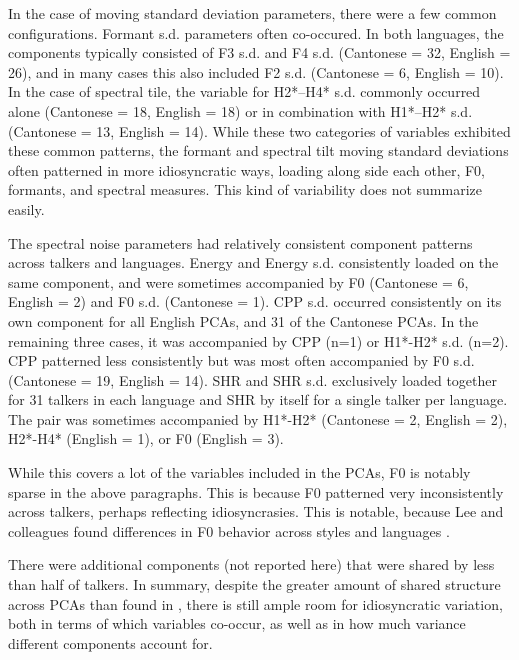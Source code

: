 
In the case of moving standard deviation parameters, there were a few common configurations. Formant s.d. parameters often co-occured. In both languages, the components typically consisted of F3 s.d. and F4 s.d. (Cantonese = 32, English = 26), and in many cases this also included F2 s.d. (Cantonese = 6, English = 10). In the case of spectral tile, the variable for H2*--H4* s.d. commonly occurred alone (Cantonese = 18, English = 18) or in combination with H1*--H2* s.d. (Cantonese = 13, English = 14). While these two categories of variables exhibited these common patterns, the formant and spectral tilt moving standard deviations often patterned in more idiosyncratic ways, loading along side each other, F0, formants, and spectral measures. This kind of variability does not summarize easily.

The spectral noise parameters had relatively consistent component patterns across talkers and languages. Energy and Energy s.d. consistently loaded on the same component, and were sometimes accompanied by F0 (Cantonese = 6, English = 2) and F0 s.d. (Cantonese = 1). CPP s.d. occurred consistently on its own component for all English PCAs, and 31 of the Cantonese PCAs. In the remaining three cases, it was accompanied by CPP (n=1) or H1*-H2* s.d. (n=2). CPP patterned less consistently but was most often accompanied by F0 s.d. (Cantonese = 19, English = 14). SHR and SHR s.d. exclusively loaded together for 31 talkers in each language and SHR by itself for a single talker per language. The pair was sometimes accompanied by H1*-H2* (Cantonese = 2, English = 2), H2*-H4* (English = 1), or F0 (English = 3). 

While this covers a lot of the variables included in the PCAs, F0 is notably sparse in the above paragraphs. This is because F0 patterned very inconsistently across talkers, perhaps reflecting idiosyncrasies. This is notable, because Lee and colleagues found differences in F0 behavior across styles and languages \citep{lee_2019_acoustic,lee_2019_spontaneous,lee_2020_language}. %

There were additional components (not reported here) that were shared by less than half of talkers. In summary, despite the greater amount of shared structure across PCAs than found in \citet{lee_2019_acoustic}, there is still ample room for idiosyncratic variation, both in terms of which variables co-occur, as well as in how much variance different components account for. 

